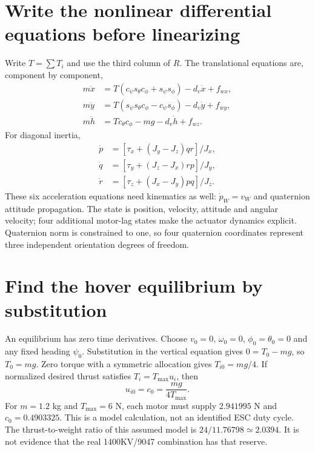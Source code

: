 \section{Write the nonlinear differential equations before linearizing}
Write $T=\sum T_i$ and use the third column of $R$. The translational equations
are, component by component,
\begin{align}
m\ddot x&=T(c_\psi s_\theta c_\phi+s_\psi s_\phi)-d_v\dot x+f_{wx},\\
m\ddot y&=T(s_\psi s_\theta c_\phi-c_\psi s_\phi)-d_v\dot y+f_{wy},\\
m\ddot h&=Tc_\theta c_\phi-mg-d_v\dot h+f_{wz}.
\end{align}
For diagonal inertia,
\begin{align}
\dot p&=[\tau_x+(J_y-J_z)qr]/J_x,\\
\dot q&=[\tau_y+(J_z-J_x)rp]/J_y,\\
\dot r&=[\tau_z+(J_x-J_y)pq]/J_z.
\end{align}
These six acceleration equations need kinematics as well: $\dot p_W=v_W$
and quaternion attitude propagation. The state is position, velocity, attitude
and angular velocity; four additional motor-lag states make the actuator
dynamics explicit. Quaternion norm is constrained to one, so four quaternion
coordinates represent three independent orientation degrees of freedom.

\section{Find the hover equilibrium by substitution}
An equilibrium has zero time derivatives. Choose $v_0=0$, $\omega_0=0$,
$\phi_0=\theta_0=0$ and any fixed heading $\psi_0$. Substitution in the
vertical equation gives $0=T_0-mg$, so $T_0=mg$. Zero torque with a symmetric
allocation gives $T_{i0}=mg/4$. If normalized desired thrust satisfies
$T_i=T_{\max}u_i$, then
\begin{equation}
u_{i0}=c_0=\frac{mg}{4T_{\max}}.
\end{equation}
For $m=1.2$ kg and $T_{\max}=6$ N, each motor must supply $2.941995$ N and
$c_0=0.4903325$. This is a model calculation, not an identified ESC duty cycle.
The thrust-to-weight ratio of this assumed model is $24/11.76798\simeq2.0394$.
It is not evidence that the real 1400KV/9047 combination has that reserve.

